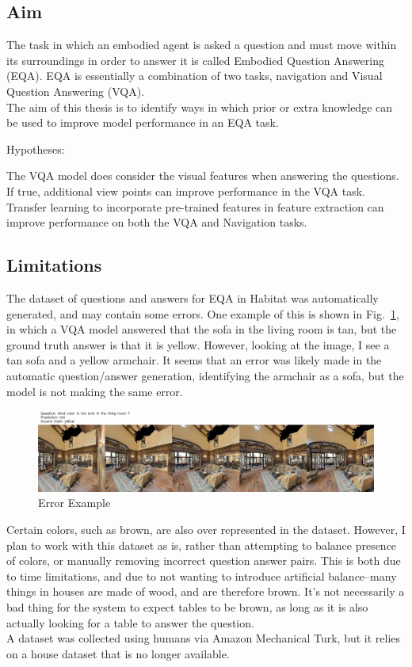 \documentclass{article}
\begin{document}
\subsection{Aim}
The task in which an embodied agent is asked a question and must move within its surroundings in order to answer it is called Embodied Question Answering (EQA). EQA is essentially a combination of two tasks, navigation and Visual Question Answering (VQA).\\
The aim of this thesis is to identify ways in which prior or extra knowledge can be used to improve model performance in an EQA task. 

Hypotheses: 
\begin{outline}
	\1 The VQA model does consider the visual features when answering the questions.
		\2 If true, additional view points can improve performance in the VQA task. 
	\1 Transfer learning to incorporate pre-trained features in feature extraction can improve performance on both the VQA and Navigation tasks.
\end{outline}


\subsection{Limitations}
The dataset of questions and answers for EQA in Habitat was automatically generated, and may contain some errors. One example of this is shown in Fig.~\ref{fig:err_ex}, in which a VQA model answered that the sofa in the living room is tan, but the ground truth answer is that it is yellow. However, looking at the image, I see a tan sofa and a yellow armchair. It seems that an error was likely made in the automatic question/answer generation, identifying the armchair as a sofa, but the model is not making the same error. \\
\begin{figure}[h]
	\centering
	\includegraphics[width=\textwidth]{../error_images/ckpt_0_121_image.jpg}
	\caption{Error Example}
	\label{fig:err_ex}
\end{figure}
Certain colors, such as brown, are also over represented in the dataset. However, I plan to work with this dataset as is, rather than attempting to balance presence of colors, or manually removing incorrect question answer pairs. This is both due to time limitations, and due to not wanting to introduce artificial balance--many things in houses are made of wood, and are therefore brown. It's not necessarily a bad thing for the system to expect tables to be brown, as long as it is also actually looking for a table to answer the question. \\
A dataset was collected using humans via Amazon Mechanical Turk, but it relies on a house dataset that is no longer available. \\
 
\end{document}
